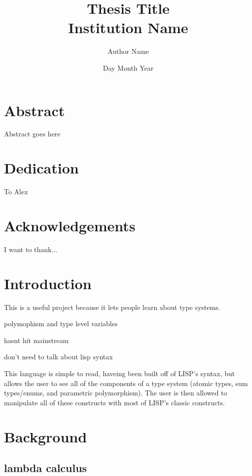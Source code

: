 \documentclass[12pt]{report}
\begin{document}
\title{
{Thesis Title}\\
{\large Institution Name}\\
}
\author{Author Name}
\date{Day Month Year}


\chapter*{Abstract}
Abstract goes here

\chapter*{Dedication}
To Alex


\chapter*{Acknowledgements}
I want to thank...

\tableofcontents

\chapter{Introduction}
This is a useful project because it lets people learn about type systems.

polymophism and type level variables

hasnt hit mainstream

don't need to talk about lisp syntax

This language is simple to read, haveing been built off of LISP's syntax, but allows the user to see all of the components of a type system (atomic types, sum types/enums, and parametric polymorphism). The user is then allowed to manipulate all of these constructs with most of LISP's classic constructs.

\chapter{Background}
\section{lambda calculus}
\end{document}
